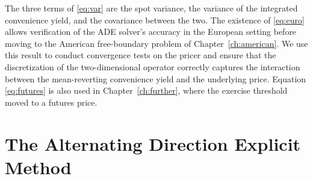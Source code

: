 \documentclass[12pt,a4paper]{article}
\begin{document}
The three terms of \eqref{eq:var} are the spot variance, the variance of the integrated convenience yield, and the covariance between the two. The existence of \eqref{eq:euro} allows verification of the ADE solver's accuracy in the European setting before moving to the American free-boundary problem of Chapter~\ref{ch:american}. We use this result to conduct convergence tests on the pricer and ensure that the discretization of the two-dimensional operator correctly captures the interaction between the mean-reverting convenience yield and the underlying price. Equation \eqref{eq:futures} is also used in Chapter~\ref{ch:further}, where the exercise threshold moved to a futures price.

\newpage


\section{The Alternating Direction Explicit Method}\label{ch:ade}
\end{document}
